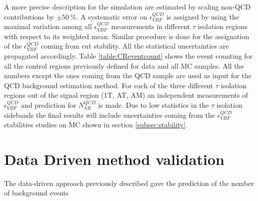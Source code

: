 \begin{table}[ht]
	\caption{ Values for $\epsilon^{QCD}_{VBF}$ and $N^{QCD}_{SR}$ for different $ \tau $ isolation regions.}
	\label{table:VBFeffBKGprediction} %
\end{table}


A more precise description for the simulation are estimated by scaling non-QCD contributions by $\pm50~\%$. A systematic error on $\epsilon^{QCD}_{VBF}$ is assigned by using the maximal variation among all $\epsilon^{QCD}_{VBF}$ measurements in different $\tau$ isolation regions with respect to its weighted mean. Similar procedure is done for the assignation of the $\epsilon^{QCD}_{VBF}$ coming from \met cut stability. All the statistical uncertainties are propagated accordingly. Table \ref{table:CReventcount} shows the event counting for all the control regions previously defined for data and all MC samples. All the numbers except the ones coming from the QCD sample are used as input for the QCD background estimation method. For each of the three different $\tau$ isolation regions out of the signal region (1T, AT, AM) an independent measurements of $\epsilon^{QCD}_{VBF}$  and prediction for $N^{QCD}_{SR}$ is made. Due to low statistics in the $\tau$ isolation sidebands the final results will include uncertainties coming from the $\epsilon^{QCD}_{VBF}$ stabilities studies on MC shown in section \ref{subsec:stability}.

\clearpage

\section{Data Driven method validation}
\label{QCD_bg_pred_validation}

The data-driven approach previously described gave the prediction of the nember of background events 

